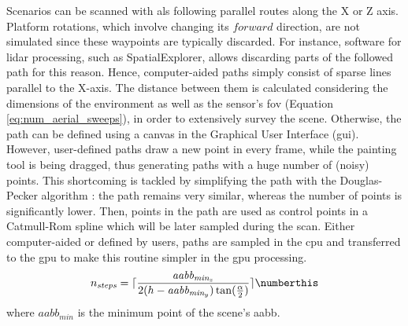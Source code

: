 Scenarios can be scanned with \acrshort{als} following parallel routes along the X or Z axis. Platform rotations, which involve changing its $\textit{forward}$ direction, are not simulated since these waypoints are typically discarded. For instance, software for \acrshort{lidar} processing, such as SpatialExplorer\textregistered, allows discarding parts of the followed path for this reason. Hence, computer-aided paths simply consist of sparse lines parallel to the X-axis. The distance between them is calculated considering the dimensions of the environment as well as the sensor's \acrshort{fov} (Equation \ref{eq:num_aerial_sweeps}), in order to extensively survey the scene. Otherwise, the path can be defined using a canvas in the Graphical User Interface (\acrshort{gui}). However, user-defined paths draw a new point in every frame, while the painting tool is being dragged, thus generating paths with a huge number of (noisy) points. This shortcoming is tackled by simplifying the path with the Douglas-Pecker algorithm \cite{douglas_algorithms_1973}: the path remains very similar, whereas the number of points is significantly lower. Then, points in the path are used as control points in a Catmull-Rom spline which will be later sampled during the scan. Either computer-aided or defined by users, paths are sampled in the \acrshort{cpu} and transferred to the \acrshort{gpu} to make this routine simpler in the \acrshort{gpu} processing. 
\begin{equation}
    n_{\textit{steps}} = \lceil{\frac{\textit{aabb}_{\textit{min}_z}}{2(h - \textit{aabb}_{\textit{min}_y})\tan(\frac{\alpha}{2})}\rceil}
    \numberthis \label{eq:num_aerial_sweeps}
\end{equation}
where $\textit{aabb}_{\textit{min}}$ is the minimum point of the scene's \acrshort{aabb}.

